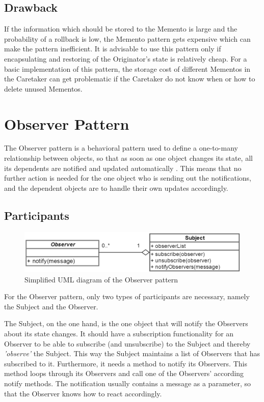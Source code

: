 \documentclass{bioinfo}
\begin{document}
\subsection{Drawback}
If the information which should be stored to the Memento is large and the probability of a rollback is low, the Memento pattern gets expensive which can make the pattern inefficient. It is advisable to use this pattern only if encapsulating and restoring of the Originator's state is relatively cheap. For a basic implementation of this pattern, the storage cost of different Mementos in the Caretaker can get problematic if the Caretaker do not know when or how to delete unused Mementos. \cite{gang4}

\section{Observer Pattern}
The Observer pattern is a behavioral pattern used to define a one-to-many relationship between objects, so that as soon as one object changes its state, all its dependents are notified and updated automatically \cite{sourcem}. This means that no further action is needed for the one object who is sending out the notifications, and the dependent objects are to handle their own updates accordingly.

\subsection{Participants}

\begin{figure}[ht]
    \centering
    \includegraphics[width=1\linewidth]{img/observer-uml.png}
    \caption{Simplified UML diagram of the Observer pattern}
    \label{fig:Observer_pattern}
\end{figure}

For the Observer pattern, only two types of participants are necessary, namely the Subject and the Observer.

The Subject, on the one hand, is the one object that will notify the Observers about its state changes. It should have a subscription functionality for an Observer to be able to subscribe (and unsubscribe) to the Subject and thereby \textit{'observe'} the Subject. This way the Subject maintains a list of Observers that has subscribed to it. Furthermore, it needs a method to notify its Observers. This method loops through its Observers and call one of the Observers’ according notify methods. The notification usually contains a message as a parameter, so that the Observer knows how to react accordingly. \cite{dofac}
\end{document}
